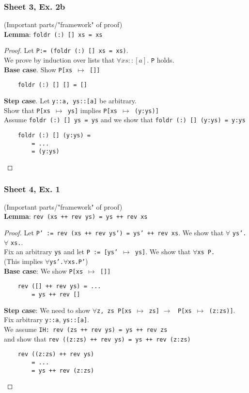 \documentclass[11.5pt]{article}
\def\li{\rightarrow}
\begin{document}
\subsubsection{Sheet 3, Ex. 2b}
(Important parts/"framework" of proof) \\
\textbf{Lemma}: \texttt{foldr (:) [] xs = xs}
\begin{proof}
    Let \texttt{P:= (foldr (:) [] xs = xs)}. \\
    We prove by induction over lists that $\forall xs::[a].$ \texttt{P} holds. \\
    \textbf{Base case}. Show \texttt{P[xs $\mapsto$ []]} 
    \begin{verbatim}
    foldr (:) [] [] = [] 
    \end{verbatim}
    \textbf{Step case}. Let \texttt{y::a, ys::[a]} be arbitrary. \\
    Show that \texttt{P[xs $\mapsto$ ys]} implies \texttt{P[xs $\mapsto$ (y:ys)]} \\
    Assume \texttt{foldr (:) [] ys = ys} and we show that \texttt{foldr (:) [] (y:ys) = y:ys}
    \begin{verbatim}
    foldr (:) [] (y:ys) = 
        = ...
        = (y:ys)
    \end{verbatim}
\end{proof}
\subsubsection{Sheet 4, Ex. 1}
(Important parts/"framework" of proof) \\
\textbf{Lemma}: \texttt{rev (xs ++ rev ys) = ys ++ rev xs}
\begin{proof}
    Let \texttt{P' := rev (xs ++ rev ys') = ys' ++ rev xs}. 
    We show that $\forall$ \texttt{ys'.}$\forall$ \texttt{xs.}. \\
    Fix an arbitrary \texttt{ys} and let \texttt{P := [ys' $\mapsto$ ys]}.
    We show that $\forall$\texttt{xs P.} \\
    (This implies $\forall$\texttt{ys'.}$\forall$\texttt{xs.P'}) \\
    \textbf{Base case}: We show \texttt{P[xs $\mapsto$ []]} 
    \begin{verbatim}
    rev ([] ++ rev ys) = ...
        = ys ++ rev []
    \end{verbatim}
    \textbf{Step case}: We need to show 
    $\forall$\texttt{z, zs P[xs $\mapsto$ zs]} $\li$ \texttt{ P[xs $\mapsto$ (z:zs)]}.\\
    Fix arbitrary \texttt{y::a}, \texttt{ys::[a]}. \\
    We assume \texttt{IH: rev (zs ++ rev ys) = ys ++ rev zs} \\
    and show that \texttt{rev ((z:zs) ++ rev ys) = ys ++ rev (z:zs)}
    
    \begin{verbatim}
    rev ((z:zs) ++ rev ys)
        = ...
        = ys ++ rev (z:zs)
    \end{verbatim}
\end{proof}
\end{document}

